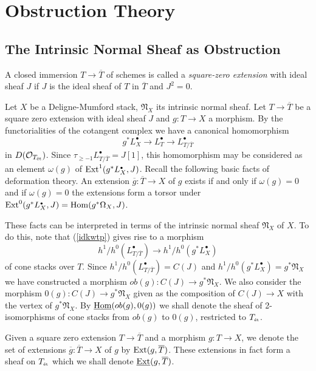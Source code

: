 \documentclass[11pt]{article}
\theoremstyle{plain}
\theoremstyle{definition}
\newcommand{\et}{{\mbox{\tiny \'{e}t}}}
\newcommand{\upst}{^{\ast}}
\newcommand{\com}{^{\scriptscriptstyle\bullet}}
\newcommand{\NN}{{\mathfrak{N}}}
\renewcommand{\O}{{\mathcal{O}}}
\newcommand{\Hom}{\mathop{\rm Hom}\nolimits}
\newcommand{\Ext}{\mathop{\rm Ext}\nolimits}
\newcommand{\ol}{\overline}
\renewcommand{\ul}{\underline}
\providecommand{\Ext}{\operatorname{Ext}}
\theoremstyle{plain}
\theoremstyle{definition}
\theoremstyle{remark}
\begin{document}
\section{Obstruction Theory}

\subsection{The Intrinsic Normal Sheaf as Obstruction}

A closed immersion \(T\to \ol T\) of schemes is called a {\em
square-zero extension }with ideal sheaf \(J\) if \(J\) is the ideal sheaf
of \(T\) in \(\ol T\) and \(J^2=0\).

Let \(X\) be a Deligne-Mumford stack, \(\NN_X\) its intrinsic normal
sheaf. Let \(T\to\ol T\) be a square zero extension with ideal sheaf \(J\)
and \(g:T\to X\) a morphism. By the functorialities of the cotangent
complex we have a canonical homomorphism
\begin{equation} \label{idkwtp}
g\upst L_X\com\longrightarrow L_T\com\longrightarrow L\com_{T/\ol T}
\end{equation}
in \(D(\O_{T_\et})\).
Since \(\tau_{\geq-1}L\com_{T/\ol T}=J[1]\), this homomorphism may be
considered as an element \(\omega(g)\) of \(\Ext^1(g\upst L_X\com,J)\).
Recall the following basic facts of deformation theory. An extension
\(\ol{g}:\ol{T}\to X\) of \(g\) exists if and only if \(\omega(g)=0\) and if
\(\omega(g)=0\) the extensions form a torsor under \(\Ext^0(g\upst
L\com_X,J)=\Hom(g\upst \Omega_X,J)\).

These facts can be interpreted in terms of the intrinsic normal sheaf
\(\NN_X\) of \(X\). To do this, note that (\ref{idkwtp}) gives rise to a
morphism
\[
h^1/h^0(L\com_{T/\ol T})\longrightarrow h^1/h^0(g\upst L\com_X)
\]
of cone stacks over \(T\). Since \(h^1/h^0(L\com_{T/\ol T})=C(J)\) and
\(h^1/h^0(g\upst L\com_X)=g\upst\NN_X\) we have constructed a morphism
\(ob(g):C(J)\to g\upst\NN_X\). We also consider the morphism
\(0(g):C(J)\to g\upst\NN_X\) given as the composition of \(C(J)\to X\)
with the vertex of \(g\upst\NN_X\). By \(\ul{\Hom}(ob(g),0(g))\) we shall
denote the sheaf of 2-isomorphisms of cone stacks from \(ob(g)\) to
\(0(g)\), restricted to \(T_\et\).

Given a square zero extension \(T\to\ol T\) and a morphism \(g:T\to X\),
we denote the set of extensions \(\ol{g}:\ol{T}\to X\) of \(g\) by
\(\Ext(g,\ol{T})\). These extensions in fact form a sheaf on \(T_\et\)
which we shall denote \(\ul{\Ext}(g,\ol{T})\).
\end{document}
